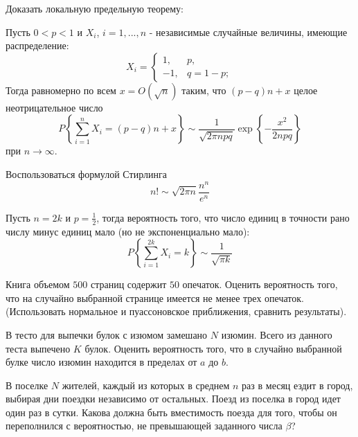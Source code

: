 \begin{problem}

Доказать локальную предельную теорему:

\noindent Пусть $0<p<1$ и $X_{i} $, $i=1,...,n$ - независимые случайные величины, имеющие распределение:
\[X_{i} =\left\{\begin{array}{cc} {1,} & {p,} \\ {-1,} & {q=1-p;} \end{array}\right. \] 
Тогда равномерно по всем $x=O\left(\sqrt{n} \right)$ таким, что $(p-q)n+x$ целое неотрицательное число
\[P\left\{\sum _{i=1}^{n}X_{i} =(p-q)n+x \right\}\sim \frac{1}{\sqrt{2\pi npq} } \exp \left\{-\frac{x^{2} }{2npq} \right\}\] 
при $n\to \infty $. 

\begin{ordre}
Воспользоваться формулой Стирлинга
\[
n! \sim \sqrt{2 \pi n} \frac{n^n}{e^n} 
\]
\end{ordre}

\begin{remark}
Пусть $n=2k$ и $p=\frac{1}{2} $, тогда вероятность того, что число единиц в точности рано числу минус единиц мало (но не экспоненциально мало):
\[P\left\{\sum _{i=1}^{2k}X_{i} =k \right\}\sim \frac{1}{\sqrt{\pi k} } \] 
\end{remark}

\end{problem}

\begin{problem}
Книга объемом $500$ страниц содержит $50$ опечаток. Оценить вероятность того, что на случайно выбранной странице 
имеется не менее трех опечаток. (Использовать нормальное и пуассоновское приближения, сравнить результаты). 
\end{problem}

\begin{problem}
В тесто для выпечки булок с изюмом замешано $N$ изюмин. Всего из данного теста выпечено $K$ булок. Оценить вероятность того, 
что в случайно выбранной булке число изюмин находится в пределах от $a$ до $b$. 
\end{problem}

\begin{problem}
В поселке $N$ жителей, каждый из которых в среднем $n$ раз в месяц ездит в город, выбирая дни поездки независимо от остальных. 
Поезд из поселка в город идет один раз в сутки. Какова должна быть вместимость поезда для того, чтобы он переполнился с вероятностью, 
не превышающей заданного числа $\beta$? 
\end{problem}

